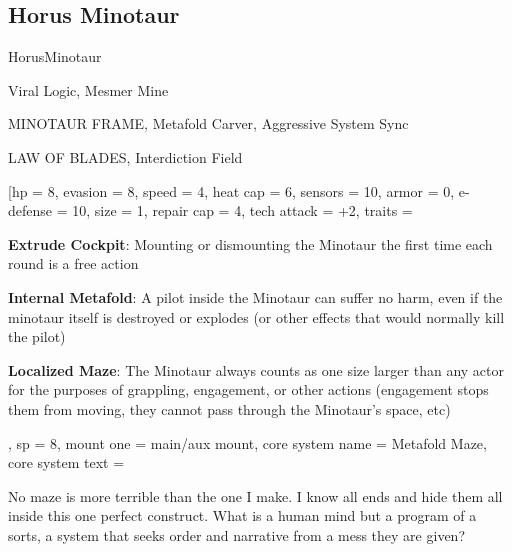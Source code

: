 \subsection{Horus Minotaur}

\begin{mech}{Horus}{Minotaur}


\begin{license}
\item Viral Logic, Mesmer Mine
\item MINOTAUR FRAME, Metafold Carver, Aggressive System Sync
\item LAW OF BLADES, Interdiction Field
\end{license}


\frameBox
[hp = 8,
evasion = 8,
speed = 4,
heat cap = 6,
sensors = 10,
armor = 0,
e-defense = 10,
size = 1,
repair cap = 4,
tech attack = +2,
traits = {
      \textbf{Extrude Cockpit}: Mounting or dismounting the Minotaur the first time each round is a free action

      \textbf{Internal Metafold}: A pilot inside the Minotaur can suffer no harm, even if the minotaur itself is destroyed or explodes (or other effects that would normally kill the pilot)

      \textbf{Localized Maze}: The Minotaur always counts as one size larger than any actor for the purposes of grappling, engagement, or other actions (engagement stops them from moving, they cannot pass through the Minotaur’s space, etc)
      },
sp = 8,
mount one = main/aux mount,
core system name = Metafold Maze,
core system text = {No maze is more terrible than the one I make. I know all ends and hide them all inside this one perfect construct. What is a human mind but a program of a sorts, a system that seeks order and narrative from a mess they are given?

}
\end{mech}
